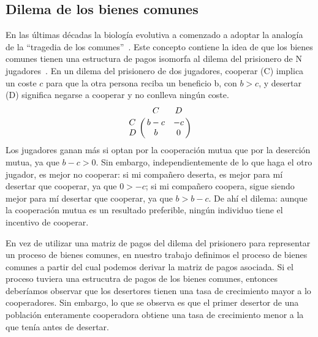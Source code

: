 \documentclass[a4paper,10pt]{article}
\begin{document}
\subsection{Dilema de los bienes comunes}

En las últimas décadas la biología evolutiva a comenzado a adoptar la analogía de la ``tragedia de los comunes''~\cite{rankin2007-tragedyCommonsBiology}.
%
Este concepto contiene la idea de que los bienes comunes tienen una estructura de pagos isomorfa al dilema del prisionero de N jugadores~\cite{hardin1971-collectiveAsPrisionerDilema}.
%
En un dilema del prisionero de dos jugadores, cooperar (C) implica un coste $c$ para que la otra persona reciba un beneficio b, con $b > c$, y desertar (D) significa negarse a cooperar y no conlleva ningún coste. 
%
\begin{equation}
  \bordermatrix{ & C & D \cr
      C & b-c & -c \cr
      D & b & 0 } 
\end{equation}
%
Los jugadores ganan más si optan por la cooperación mutua que por la deserción mutua, ya que $b - c > 0$.
%
Sin embargo, independientemente de lo que haga el otro jugador, es mejor no cooperar: si mi compañero deserta, es mejor para mí desertar que cooperar, ya que $0 > -c$; si mi compañero coopera, sigue siendo mejor para mí desertar que cooperar, ya que $b > b - c$.
%
De ahí el dilema: aunque la cooperación mutua es un resultado preferible, ningún individuo tiene el incentivo de cooperar.


En vez de utilizar una matriz de pagos del dilema del prisionero para representar un proceso de bienes comunes, en nuestro trabajo definimos el proceso de bienes comunes a partir del cual podemos derivar la matriz de pagos asociada.
%
Si el proceso tuviera una estrucutra de pagos de los bienes comunes, entonces deberíamos observar que los desertores tienen una tasa de crecimiento mayor a lo cooperadores.
%
Sin embargo, lo que se observa es que el primer desertor de una población enteramente cooperadora obtiene una tasa de crecimiento menor a la que tenía antes de desertar. 

\end{document}
